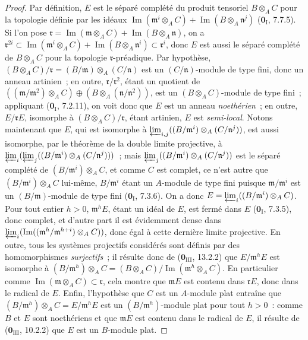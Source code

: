 \begin{proof}
Par définition, $E$ est le séparé complété du produit tensoriel $B\otimes_A C$
pour la topologie définie par les idéaux
$\operatorname{Im}(\mathfrak m^i\otimes_A C)+
\operatorname{Im}(B\otimes_A\mathfrak n^j)$
($\mathbf 0_{\mathrm I}$, 7.7.5). Si l'on pose
$\mathfrak r=\operatorname{Im}(\mathfrak m\otimes_A C)+
\operatorname{Im}(B\otimes_A\mathfrak n)$,
on a
$\mathfrak r^{2i}\subset
\operatorname{Im}(\mathfrak m^i\otimes_A C)+
\operatorname{Im}(B\otimes_A\mathfrak n^i)\subset\mathfrak r^i$, donc $E$
est aussi le séparé complété de $B\otimes_A C$ pour la topologie
$\mathfrak r$-préadique. Par hypothèse,
$(B\otimes_A C)/\mathfrak r=(B/\mathfrak m)\otimes_A(C/\mathfrak n)$ est un
$(C/\mathfrak n)$-module de type fini, donc un anneau artinien~; en outre,
$\mathfrak r/\mathfrak r^2$, étant un quotient de
$((\mathfrak m/\mathfrak m^2)\otimes_A C)
\oplus(B\otimes_A(\mathfrak n/\mathfrak n^2))$,
est un $(B\otimes_A C)$-module de type fini~; appliquant
($\mathbf 0_{\mathrm I}$, 7.2.11), on voit donc que $E$ est un anneau
\emph{noethérien}~; en outre, $E/\mathfrak rE$, isomorphe à
$(B\otimes_A C)/\mathfrak r$, étant artinien, $E$ est \emph{semi-local}.
Notons maintenant que $E$, qui est isomorphe à
$\varprojlim_{i,j}((B/\mathfrak m^i)\otimes_A(C/\mathfrak n^j))$,
est aussi isomorphe, par le théorème de la double limite projective, à
$\varprojlim_i(\varprojlim_j
  ((B/\mathfrak m^i)\otimes_A(C/\mathfrak n^j)))$~;
mais $\varprojlim_j((B/\mathfrak m^i)\otimes_A(C/\mathfrak n^j))$
est le
séparé complété de $(B/\mathfrak m^i)\otimes_A C$, et comme $C$ est complet,
ce n'est autre que $(B/\mathfrak m^i)\otimes_A C$ lui-même,
$B/\mathfrak m^i$ étant un $A$-module de type fini puisque
$\mathfrak m/\mathfrak m^i$ est un $(B/\mathfrak m)$-module de type fini
($\mathbf 0_{\mathrm I}$, 7.3.6). On a donc
$E=\varprojlim_i((B/\mathfrak m^i)\otimes_A C)$.
Pour tout entier $h>0$, $\mathfrak m^hE$, étant un idéal de $E$, est fermé
dans $E$ ($\mathbf 0_{\mathrm I}$, 7.3.5), donc complet, et d'autre part il est
évidemment dense dans
$\varprojlim_i(\operatorname{Im}((\mathfrak m^h/\mathfrak m^{h+i})\otimes_A C))$,
donc égal à cette dernière limite projective. En outre, tous les systèmes
projectifs considérés sont définis par des homomorphismes \emph{surjectifs}~;
il résulte donc de ($\mathbf 0_{\mathrm{III}}$, 13.2.2) que
$E/\mathfrak m^hE$ est isomorphe à
$(B/\mathfrak m^h)\otimes_A C=(B\otimes_A C)/\operatorname{Im}(\mathfrak m^h\otimes_A C)$.
En particulier comme
$\operatorname{Im}(\mathfrak m\otimes_A C)\subset\mathfrak r$, cela montre
que $\mathfrak mE$ est contenu dans $\mathfrak rE$, donc dans le radical de
$E$. Enfin, l'hypothèse que $C$ est un $A$-module plat entraîne que
$(B/\mathfrak m^h)\otimes_A C=E/\mathfrak m^hE$ est un
$(B/\mathfrak m^h)$-module plat pour tout $h>0$~: comme $B$ et $E$ sont
noethériens et que $\mathfrak mE$ est contenu dans le radical de $E$, il
résulte de ($\mathbf 0_{\mathrm{III}}$, 10.2.2) que $E$ est un $B$-module
plat.
\end{proof}

